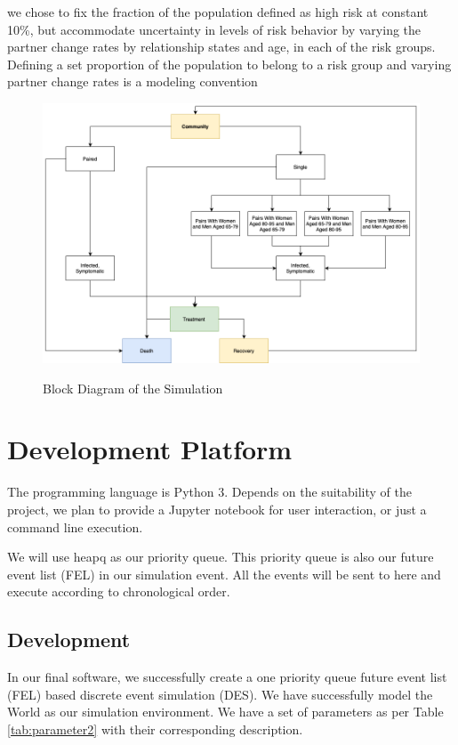 \documentclass{article}
\begin{document}
\begin{normalsize}
   	we chose to fix the fraction of the population defined as high risk at constant 10\%, but accommodate uncertainty in levels of risk behavior by varying the partner change rates by relationship states and age, in each of the risk groups. Defining a set proportion of the population to belong to a risk group and varying partner change rates is a modeling convention

    

	

\begin{figure}[H]
\caption{Block Diagram of  the Simulation}
\centering
\includegraphics[width=1\textwidth]{BlockDiagram.png}
\label{fig:blockDiagram}
\end{figure}


    \section{Development Platform}
    The programming language is Python $3$. Depends on the suitability of the project, we plan to provide a Jupyter notebook for user interaction, or just a command line execution.
    
    We will use heapq as our priority queue. This priority queue is also our future event list (FEL) in our simulation event. All the events will be sent to here and execute according to chronological order.
     
	\subsection{Development}
	In our final software, we successfully create a one priority queue future event list (FEL) based discrete event simulation (DES).  
	We have successfully model the World as our simulation environment. We have a set of parameters as per Table \ref{tab:parameter2} with their corresponding description.
	

\end{normalsize}
\end{document}

